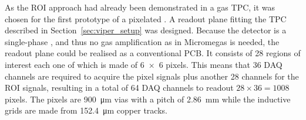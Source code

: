 As the ROI approach had already been demonstrated in a gas TPC, it was chosen for the first prototype of a pixelated \lartpc.
A readout plane fitting the TPC described in Section~\ref{sec:viper_setup} was designed.
Because the detector is a single-phase \lartpc, and thus no gas amplification as in Micromegas is needed, the readout plane could be realised as a conventional PCB.
It consists of \num{28} regions of interest each one of which is made of \num{6 x 6} pixels.
This means that \num{36} DAQ channels are required to acquire the pixel signals plus another \num{28} channels for the ROI signals, resulting in a total of \num{64} DAQ channels to readout $28 \times 36 = 1008$ pixels.
The pixels are \SI{900}{\micro\metre} vias with a pitch of \SI{2.86}{\milli\metre} while the inductive grids are made from \SI{152.4}{\micro\metre} copper tracks.